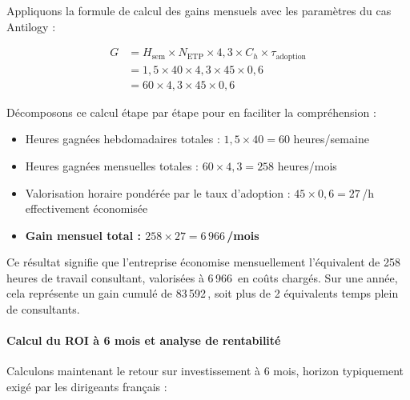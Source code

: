 Appliquons la formule de calcul des gains mensuels avec les paramètres du cas Antilogy :

\begin{align}
G &= H_{\text{sem}} \times N_{\text{ETP}} \times 4{,}3 \times C_h \times \tau_{\text{adoption}} \\
&= 1{,}5 \times 40 \times 4{,}3 \times 45 \times 0{,}6 \\
&= 60 \times 4{,}3 \times 45 \times 0{,}6
\end{align}

Décomposons ce calcul étape par étape pour en faciliter la compréhension :
\begin{itemize}
    \item Heures gagnées hebdomadaires totales : $1{,}5 \times 40 = 60$ heures/semaine
    \item Heures gagnées mensuelles totales : $60 \times 4{,}3 = 258$ heures/mois
    \item Valorisation horaire pondérée par le taux d'adoption : $45 \times 0{,}6 = 27$\,\texteuro{}/h effectivement économisée
    \item \textbf{Gain mensuel total : $258 \times 27 = 6\,966$\,\texteuro{}/mois}
\end{itemize}
\medskip
Ce résultat signifie que l'entreprise économise mensuellement l'équivalent de 258 heures de travail consultant, valorisées à 6\,966\,\texteuro{} en coûts chargés. Sur une année, cela représente un gain cumulé de 83\,592\,\texteuro{}, soit plus de 2 équivalents temps plein de consultants.

\paragraph{Calcul du ROI à 6 mois et analyse de rentabilité}

Calculons maintenant le retour sur investissement à 6 mois, horizon typiquement exigé par les dirigeants français :


